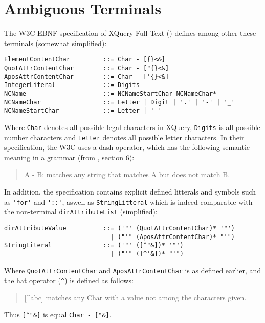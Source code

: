 \section{Ambiguous Terminals}
The W3C EBNF specification of XQuery Full Text (\cite{w3c01}) defines among other these terminals (somewhat simplified):
\begin{verbatim}
ElementContentChar         ::= Char - [{}<&]
QuotAttrContentChar        ::= Char - ["{}<&]
AposAttrContentChar        ::= Char - ['{}<&]
IntegerLiteral             ::= Digits
NCName                     ::= NCNameStartChar NCNameChar*
NCNameChar                 ::= Letter | Digit | '.' | '-' | '_'
NCNameStartChar            ::= Letter | '_'
\end{verbatim}
Where \verb!Char! denotes all possible legal characters in XQuery, \verb!Digits! is all possible number characters and \verb!Letter! denotes all possible letter characters. In their specification, the W3C uses a dash operator, which has the following
semantic meaning in a grammar (from \cite{w3c03}, section 6):
\begin{quote}
A - B: matches any string that matches A but does not match B.
\end{quote}
In addition, the specification contains explicit defined litterals and symbols such as \verb!'for'! and \verb!'::'!, aswell as \verb!StringLitteral! which is indeed comparable with the non-terminal \verb!dirAttributeList! (simplified):
\begin{verbatim}
dirAttributeValue          ::= ('"' (QuotAttrContentChar)* '"')
                             | ("'" (AposAttrContentChar)* "'")
StringLiteral              ::= ('"' ([^"&])* '"') 
                             | ("'" ([^'&])* "'")
\end{verbatim}
Where \verb!QuotAttrContentChar! and \verb!AposAttrContentChar! is as defined earlier, and the hat operator (\verb!^!) is defined as follows:
\begin{quote}
[^abc] matches any Char with a value not among the characters given.
\end{quote}
Thus \verb![^"&]! is equal \verb!Char - ["&]!.